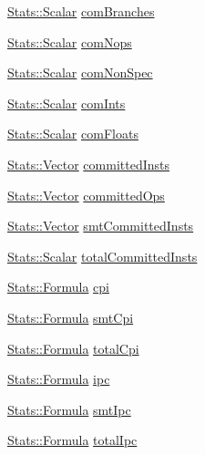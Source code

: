\begin{DoxyCompactItemize}
\hyperlink{classStats_1_1Scalar}{Stats::Scalar} \hyperlink{classInOrderCPU_afe1814e3fca0fc42be2257c61d7047b3}{comBranches}
\item 
\hyperlink{classStats_1_1Scalar}{Stats::Scalar} \hyperlink{classInOrderCPU_a60adec944be46cf99b376a9c146ab51f}{comNops}
\item 
\hyperlink{classStats_1_1Scalar}{Stats::Scalar} \hyperlink{classInOrderCPU_ac2b81fdbc0cd90a375b12b796c582cf8}{comNonSpec}
\item 
\hyperlink{classStats_1_1Scalar}{Stats::Scalar} \hyperlink{classInOrderCPU_a0414c26e057889c01ab11e1f0a6cb01b}{comInts}
\item 
\hyperlink{classStats_1_1Scalar}{Stats::Scalar} \hyperlink{classInOrderCPU_a2ac44abc59509ccec79a76bb16812848}{comFloats}
\item 
\hyperlink{classStats_1_1Vector}{Stats::Vector} \hyperlink{classInOrderCPU_a45901e46dca5846ddd857aecbee16645}{committedInsts}
\item 
\hyperlink{classStats_1_1Vector}{Stats::Vector} \hyperlink{classInOrderCPU_a16789fd9e4f632e091d740c772094f80}{committedOps}
\item 
\hyperlink{classStats_1_1Vector}{Stats::Vector} \hyperlink{classInOrderCPU_ab248e5224d70f89e3a901480b5170d8e}{smtCommittedInsts}
\item 
\hyperlink{classStats_1_1Scalar}{Stats::Scalar} \hyperlink{classInOrderCPU_aec59f0599a86f88751992e5825e25c22}{totalCommittedInsts}
\item 
\hyperlink{classStats_1_1Formula}{Stats::Formula} \hyperlink{classInOrderCPU_af68d211cace2daa3df90471d7af93ad8}{cpi}
\item 
\hyperlink{classStats_1_1Formula}{Stats::Formula} \hyperlink{classInOrderCPU_a1d87e3c89d12e8b8a87c71af10ece177}{smtCpi}
\item 
\hyperlink{classStats_1_1Formula}{Stats::Formula} \hyperlink{classInOrderCPU_a5bd2f06c271dd03138cad92251716f5d}{totalCpi}
\item 
\hyperlink{classStats_1_1Formula}{Stats::Formula} \hyperlink{classInOrderCPU_a6f168a31ee4084b6167d6761a4124014}{ipc}
\item 
\hyperlink{classStats_1_1Formula}{Stats::Formula} \hyperlink{classInOrderCPU_a022f90f00731c9b5399eddfda76c6d6b}{smtIpc}
\item 
\hyperlink{classStats_1_1Formula}{Stats::Formula} \hyperlink{classInOrderCPU_ae8551f10097f4b2e5ed3febf0d9417e3}{totalIpc}
\end{DoxyCompactItemize}
